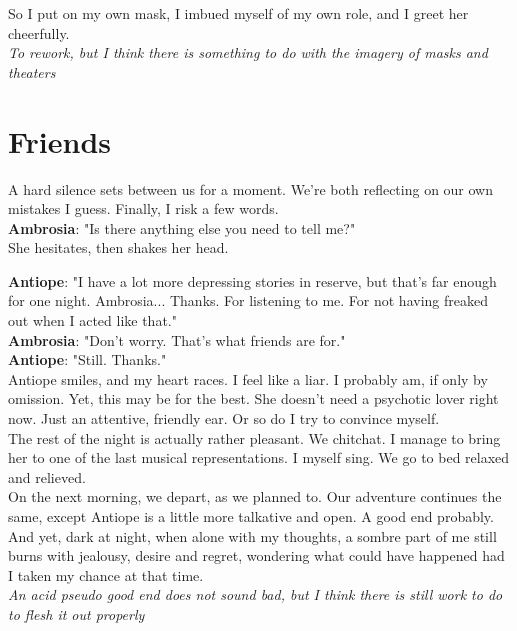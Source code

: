 \documentclass{report}
\newcommand{\dcomment}[1]{
	\emph{#1}
	\\
}
\newcommand{\speaker}[1]{
	\textbf{#1}: 
}
\newcommand{\gsection}[1]{
	\section*{#1}
	\label{#1}
}
\begin{document}
So I put on my own mask, I imbued myself of my own role, and I greet her cheerfully.\\

\dcomment{
	To rework, but I think there is something to do with the imagery of masks and theaters
}

\gsection{Friends}

A hard silence sets between us for a moment. We're both reflecting on our own mistakes I guess. Finally, I risk a few words.\\

\speaker{Ambrosia} "Is there anything else you need to tell me?"\\

She hesitates, then shakes her head.

\speaker{Antiope} "I have a lot more depressing stories in reserve, but that's far enough for one night. Ambrosia... Thanks. For listening to me. For not having freaked out when I acted like that."\\

\speaker{Ambrosia} "Don't worry. That's what friends are for."\\

\speaker{Antiope} "Still. Thanks."\\

Antiope smiles, and my heart races. I feel like a liar. I probably am, if only by omission. Yet, this may be for the best. She doesn't need a psychotic lover right now. Just an attentive, friendly ear. Or so do I try to convince myself.\\

The rest of the night is actually rather pleasant. We chitchat. I manage to bring her to one of the last musical representations. I myself sing. We go to bed relaxed and relieved.\\

On the next morning, we depart, as we planned to. Our adventure continues the same, except Antiope is a little more talkative and open. A good end probably.\\

And yet, dark at night, when alone with my thoughts, a sombre part of me still burns with jealousy, desire and regret, wondering what could have happened had I taken my chance at that time.\\

\dcomment{
	An acid pseudo good end does not sound bad, but I think there is still work to do to flesh it out properly
}
\end{document}
